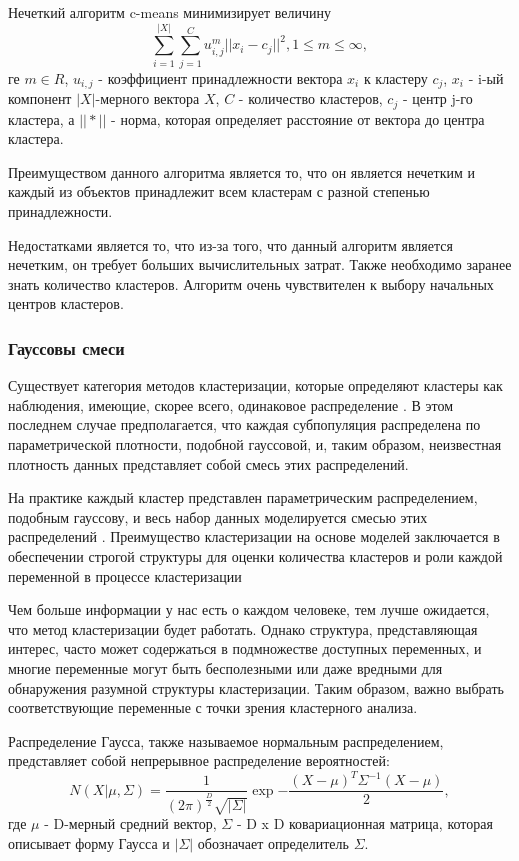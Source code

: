 Нечеткий алгоритм c-means минимизирует величину 
\begin{equation}
	\sum_{i=1}^{|X|} \sum_{j=1}^C u_{i,j}^m ||x_i - c_j||^2, 1 \leq m \leq \infty,
\end{equation}
ге $m \in R$, $u_{i,j}$ - коэффициент принадлежности вектора $x_i$ к кластеру $c_j$, $x_i$ - i-ый компонент $|X|$-мерного вектора $X$, $C$ - количество кластеров, $c_j$ - центр j-го кластера, а $|| * ||$ - норма, которая определяет расстояние от вектора до центра кластера.

Преимуществом данного алгоритма является то, что он является нечетким и каждый из объектов принадлежит всем кластерам с разной степенью принадлежности.

Недостатками является то, что из-за того, что данный алгоритм является нечетким, он требует больших вычислительных затрат. Также необходимо заранее знать количество кластеров. Алгоритм очень чувствителен к выбору начальных центров кластеров.

\subsubsection{Гауссовы смеси} 
Существует категория методов кластеризации, которые определяют кластеры как наблюдения, имеющие, скорее всего, одинаковое распределение \cite{maugis2013adaptive}. В этом последнем случае предполагается, что каждая субпопуляция распределена по параметрической плотности, подобной гауссовой, и, таким образом, неизвестная плотность данных представляет собой смесь этих распределений.

На практике каждый кластер представлен параметрическим распределением, подобным гауссову, и весь набор данных моделируется смесью этих распределений \cite{schieferdecker2009gaussian}. Преимущество кластеризации на основе моделей заключается в обеспечении строгой структуры для оценки количества кластеров и роли каждой переменной в процессе кластеризации

Чем больше информации у нас есть о каждом человеке, тем лучше ожидается, что метод кластеризации будет работать. Однако структура, представляющая интерес, часто может содержаться в подмножестве доступных переменных, и многие переменные могут быть бесполезными или даже вредными для обнаружения разумной структуры кластеризации. Таким образом, важно выбрать соответствующие переменные с точки зрения кластерного анализа.

Распределение Гаусса, также называемое нормальным распределением, представляет собой непрерывное распределение вероятностей:
\begin{equation}
	N(X|\mu, \Sigma) = \frac{1}{(2\pi)^{\frac{D}{2}} \sqrt{|\Sigma|}} \exp{-\frac{(X-\mu)^T\Sigma^{-1}(X-\mu)}{2}},
\end{equation}
где $\mu$ - D-мерный средний вектор, $\Sigma$ - D x D ковариационная матрица, которая описывает форму Гаусса и $|\Sigma|$ обозначает определитель $\Sigma$.

